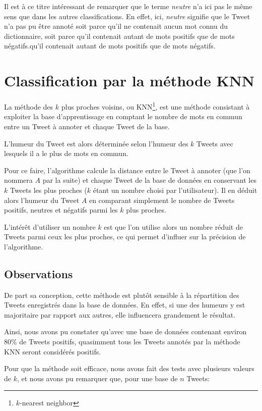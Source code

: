 \documentclass[12pt,a4paper]{report}
\begin{document}
Il est à ce titre intéressant de remarquer que le terme \textit{neutre} n'a ici
pas le même sens que dans les autres classifications. En effet, ici,
\textit{neutre} signifie que le Tweet n'a pas pu être annoté soit parce qu'il ne
contenait aucun mot connu du dictionnaire, soit parce qu'il contenait autant de
mots positifs que de mots négatifs.qu'il contenait autant de mots positifs que
de mots négatifs.

\section{Classification par la méthode KNN}
La méthode des $k$ plus proches voisins, ou KNN\footnote{$k$-nearest neighbor},
est une méthode consistant à exploiter la base d'apprentissage en comptant le
nombre de mots en commun entre un Tweet à annoter et chaque Tweet de la base.

L'humeur du Tweet est alors déterminée selon l'humeur des $k$ Tweets
avec lesquels il a le plus de mots en commun.

Pour ce faire, l'algorithme calcule la distance entre le Tweet à annoter (que
l'on nommera $A$ par la suite) et chaque Tweet de la base de données
en conservant les $k$ Tweets les plus proches ($k$ étant un nombre
choisi par l'utilisateur). Il en déduit alors l'humeur du Tweet $A$ en comparant
simplement le nombre de Tweets positifs, neutres et négatifs parmi les $k$ plus
proches.

L'intérêt d'utiliser un nombre $k$ est que l'on utilise alors un nombre réduit
de Tweets parmi ceux les plus proches, ce qui permet d'influer sur la précision
de l'algorithme.

\subsection{Observations}
De part sa conception, cette méthode est plutôt sensible à la répartition des
Tweets enregistrés dans la base de données. En effet, si une des humeurs y est
majoritaire par rapport aux autres, elle influencera grandement le résultat.

Ainsi, nous avons pu constater qu'avec une base de données contenant environ
80\% de Tweets positifs, quasimment tous les Tweets annotés par la méthode KNN
seront considérés positifs.

Pour que la méthode soit efficace, nous avons fait des tests avec plusieurs
valeurs de $k$, et nous avons pu remarquer que, pour une base de $n$ Tweets:
\end{document}
